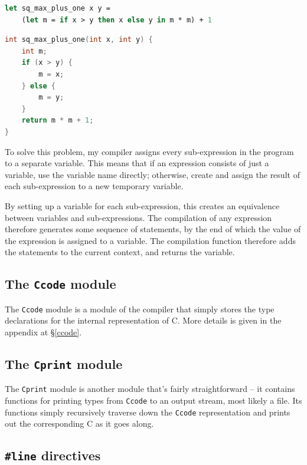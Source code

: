 \begin{lstlisting}[language=Caml]
let sq_max_plus_one x y =
    (let m = if x > y then x else y in m * m) + 1
\end{lstlisting}

\begin{lstlisting}[language=C]
int sq_max_plus_one(int x, int y) {
    int m;
    if (x > y) {
        m = x;
    } else {
        m = y;
    }
    return m * m + 1;
}
\end{lstlisting}

To solve this problem, my compiler assigns every sub-expression in the program
to a separate variable. This means that if an expression consists of just a
variable, use the variable name directly; otherwise, create and assign the
result of each sub-expression to a new temporary variable.

By setting up a variable for each sub-expression, this creates an equivalence
between variables and sub-expressions. The compilation of any expression
therefore generates some sequence of statements, by the end of which the value
of the expression is assigned to a variable. The compilation function therefore
adds the statements to the current context, and returns the variable. 

\subsection{The \texttt{Ccode} module}

The \texttt{Ccode} module is a module of the compiler that simply stores the
type declarations for the internal representation of C. More details is given in
the appendix at \S\ref{ccode}.

\subsection{The \texttt{Cprint} module}

The \texttt{Cprint} module is another module that's fairly straightforward --
it contains functions for printing types from \texttt{Ccode} to an output
stream, most likely a file. Its functions simply recursively traverse down the
\texttt{Ccode} representation and prints out the corresponding C as it goes
along.

\subsection{\texttt{\#}\texttt{line} directives}\label{line-directive}

